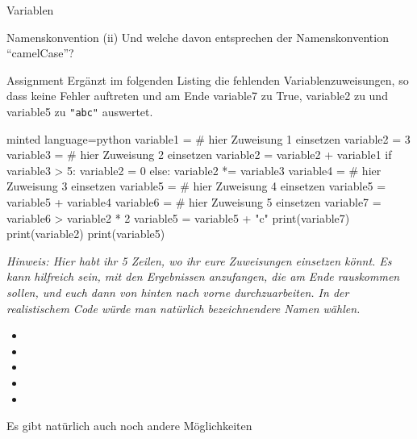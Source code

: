 \begin{task}[points=auto]{Variablen }
\begin{subtask*}[points=0]{Namenskonvention}
        (ii) Und welche davon entsprechen der Namenskonvention \enquote{camelCase}?
    \end{subtask*}
    \begin{subtask*}[points=0]{Assignment}
        Ergänzt im folgenden Listing die fehlenden Variablenzuweisungen, so dass keine Fehler auftreten und am Ende {\ttfamily variable7} zu {\ttfamily True}, {\ttfamily variable2} zu {} und {\ttfamily variable5} zu {\ttfamily \verb+"abc"+} auswertet.
        \begin{codeBlock}[]{minted language=python}
            variable1 = # hier Zuweisung 1 einsetzen
            variable2 = 3
            variable3 = # hier Zuweisung 2 einsetzen
            variable2 = variable2 + variable1
            if variable3 > 5:
                variable2 = 0
            else:
                variable2 *= variable3
            variable4 = # hier Zuweisung 3 einsetzen
            variable5 = # hier Zuweisung 4 einsetzen
            variable5 = variable5 + variable4
            variable6 = # hier Zuweisung 5 einsetzen
            variable7 = variable6 > variable2 * 2
            variable5 = variable5 + "c"
            print(variable7)
            print(variable2)
            print(variable5)
        \end{codeBlock}

        \textit{Hinweis: Hier habt ihr 5 Zeilen, wo ihr eure Zuweisungen einsetzen könnt. Es kann hilfreich sein, mit den Ergebnissen anzufangen, die am Ende rauskommen sollen, und euch dann von hinten nach vorne durchzuarbeiten. In der realistischem Code würde man natürlich bezeichnendere Namen wählen.}

        \begin{solution}
            \begin{itemize}
                \item {}
                \item {}
                \item {}
                \item {}
                \item {}
            \end{itemize}
            Es gibt natürlich auch noch andere Möglichkeiten
        \end{solution}
    \end{subtask*}
\end{task}
